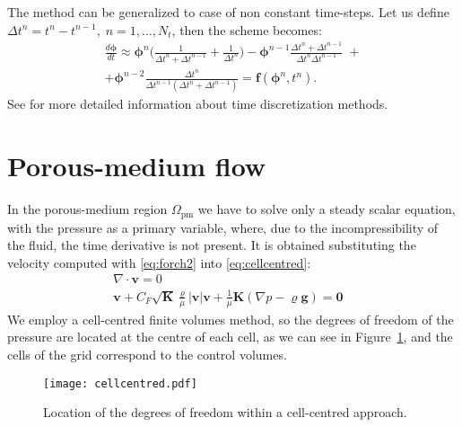 The method can be generalized to case of non constant time-steps. Let us define 
$\Delta t^n=t^n-t^{n-1}, \; n=1,\dots,N_t$, then the scheme becomes:
\begin{multline} \label{eq:bdf2gen}
\frac{d \boldsymbol{\phi}}{d t} \approx \boldsymbol{\phi}^n\bigg( \frac{1}{\Delta t^n + 
	\Delta t^{n-1}} + \frac{1}{\Delta t^n}\bigg) - \boldsymbol{\phi}^{n-1} \frac{\Delta t^n 
	+ \Delta t^{n-1}}{\Delta t^n \Delta t^{n-1}} \;+ \\+ \boldsymbol{\phi}^{n-2} 
\frac{\Delta 
	t^n}{\Delta t^{n-1} (\Delta t^n + \Delta t^{n-1})} = \mathbf{f}(\boldsymbol{\phi}^n,t^n).
\end{multline}
See \cite{main:matenum} for more detailed information about time discretization 
methods.
%
\section{Porous-medium flow}
In the porous-medium region $\Omega_\text{pm}$ we have to solve only a steady 
scalar equation, with the pressure as a primary variable, where, due to the 
incompressibility of the fluid, the time derivative is not present. It is obtained substituting the velocity computed with \eqref{eq:forch2} into \eqref{eq:cellcentred}: 
\begin{align}
\label{eq:cellcentred}	\nabla \cdot \mathbf{v} = 0&\\
\label{eq:forch2}	\mathbf{v} + C_F \sqrt{\mathbf{K}} \frac{\varrho}{\mu} 
	|\mathbf{v}|\mathbf{v} + \frac{1}{\mu} \mathbf{K}(\nabla p - \varrho 
	\mathbf{g} ) = \mathbf{0}&
\end{align}
We employ a cell-centred finite volumes method, so the degrees of freedom of 
the pressure are located at the centre of each cell, as we can see in 
Figure~\ref{fig:cellcentred}, and the cells of the grid correspond to the 
control volumes.
\begin{figure}
	\centering
	\texttt{[image: cellcentred.pdf]}
	\caption[Cell-centred grid]{Location of the degrees of freedom within a 
	cell-centred approach.}
	\label{fig:cellcentred}
\end{figure}

